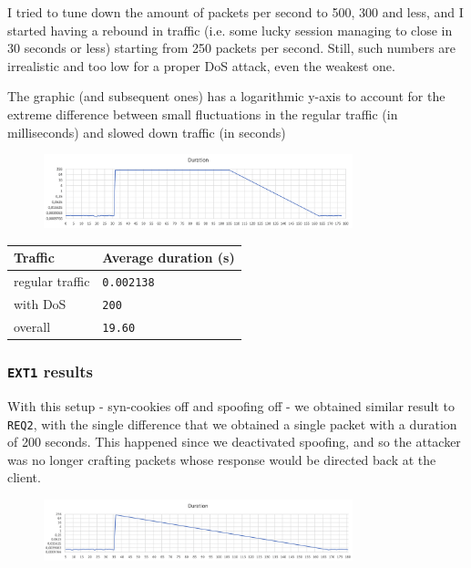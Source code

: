 \documentclass[a4paper,11pt,hidelinks]{article}
\begin{document}
I tried to tune down the amount of packets per second to 500, 300 and less, and I started having a rebound in traffic (i.e. some lucky session managing to close in 30 seconds or less) starting from 250 packets per second. Still, such numbers are irrealistic and too low for a proper DoS attack, even the weakest one.

The graphic (and subsequent ones) has a logarithmic y-axis to account for the extreme difference between small fluctuations in the regular traffic (in milliseconds) and slowed down traffic (in seconds)

\begin{figure}[h!]
  \centering
  \includegraphics[width=0.8\textwidth]{../drawable/req2.png}
\end{figure}

\begin{table}[h!]
  \centering
  \begin{tabular}{|l|l|}
    \hline
    Traffic         & Average duration (s)    \\ \hline
    regular traffic & \verb=0.002138= \\ \hline
    with DoS        & \verb=200= \\ \hline
    overall         & \verb=19.60= \\ \hline
  \end{tabular}
\end{table}

\newpage

\subsubsection{\texttt{EXT1} results}

With this setup - syn-cookies off and spoofing off - we obtained similar result to \verb=REQ2=, with the single difference that we obtained a single packet with a duration of 200 seconds. This happened since we deactivated spoofing, and so the attacker was no longer crafting packets whose response would be directed back at the client.

\begin{figure}[h!]
  \centering
  \includegraphics[width=0.8\textwidth]{../drawable/ext1.png}
\end{figure}
\end{document}
